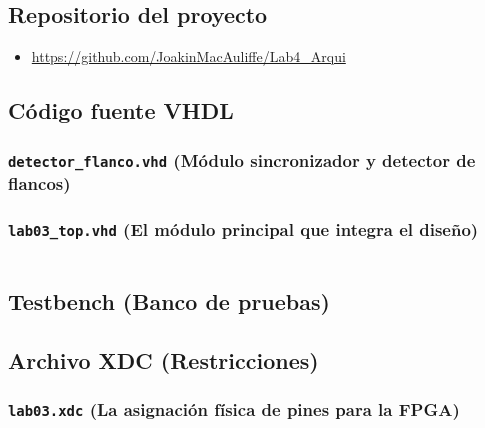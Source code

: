 \documentclass[letterpaper,12pt]{article}
\begin{document}
\subsection{Repositorio del proyecto}

\begin{itemize}
    \item \url{https://github.com/JoakinMacAuliffe/Lab4_Arqui}
\end{itemize}

\subsection{Código fuente VHDL}

\subsubsection{\texttt{detector\_flanco.vhd} (Módulo sincronizador y detector de flancos)}

\subsubsection{\texttt{lab03\_top.vhd} (El módulo principal que integra el diseño)}
\begin{lstlisting}[language=VHDL, caption={lab03\_top.vhd}]

\end{lstlisting}

\subsection{Testbench (Banco de pruebas)}

\subsection{Archivo XDC (Restricciones)}

\subsubsection{\texttt{lab03.xdc} (La asignación física de pines para la FPGA)}
\begin{lstlisting}[language=tcl, caption={lab03.xdc}]

\end{lstlisting}
\end{document}
